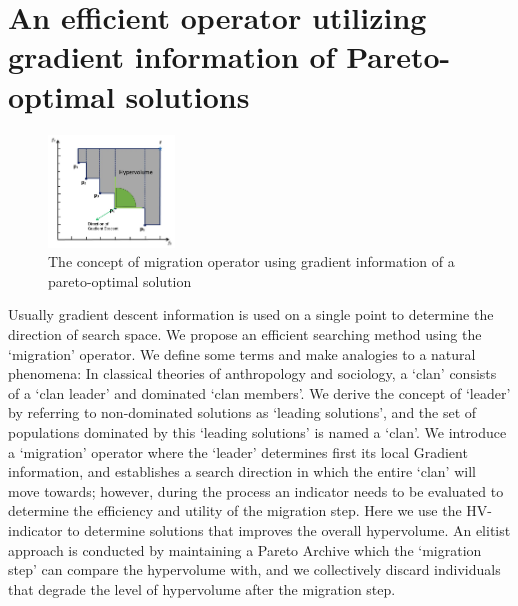 \documentclass[%
 reprint,
 amsmath,amssymb,
 aps,
]{revtex4-2}
\begin{document}
\section{\label{sec:level1}	
An efficient operator utilizing\protect\\ gradient information of Pareto-optimal solutions
}

\begin{figure}[b]
\includegraphics[width=0.3\textwidth]{fig_4}
\caption{\label{fig:Migration operator} The concept of migration operator using gradient information of a pareto-optimal solution}
\end{figure}

Usually gradient descent information is used on a single point to determine the direction of search space. We propose an efficient searching method using the `migration' operator. We define some terms and make analogies to a natural phenomena: In classical theories of anthropology and sociology, a `clan' consists of a `clan leader' and dominated `clan members'. We derive the concept of `leader' by referring to non-dominated solutions as `leading solutions', and the set of populations dominated by this `leading solutions' is named a `clan'. We introduce a `migration' operator where the `leader' determines first its local Gradient information, and establishes a search direction in which the entire `clan' will move towards; however, during the process an indicator needs to be evaluated to determine the efficiency and utility of the migration step. Here we use the HV-indicator to determine solutions that improves the overall hypervolume. An elitist approach is conducted by maintaining a Pareto Archive which the `migration step' can compare the hypervolume with, and we collectively discard individuals that degrade the level of hypervolume after the migration step.
\nocite{*}

\end{document}
